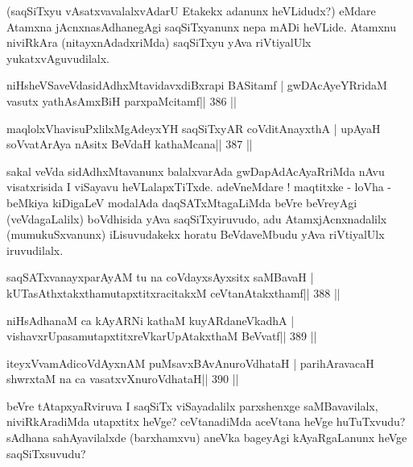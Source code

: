 \begin{artha}
(saqSiTxyu vAsatxvavalalxvAdarU Etakekx adanunx heVLidudx?) eMdare  \mdash  
Atamxna jAcnxnasAdhanegAgi saqSiTxyanunx nepa mADi heVLide. Atamxnu niviRkAra (nitayxnAdadxriMda) saqSiTxyu yAva riVtiyalUlx yukatxvAguvudilalx.
\end{artha}


\begin{shl}
niHsheVSaveVdasidAdhxMtavidavxdiBxrapi BASitamf |
gwDAcAyeYRridaM vasutx yathA\s sAmxBiH parxpaMcitamf\hfill || 386 ||
\end{shl}

\begin{shl}
maqlolxVhavisuPxlilxMgAdeyxYH saqSiTxyAR coVditA\s nayxthA |
upAyaH soV\s vatArAya nAsitx BeVdaH kathaMcana\hfill || 387 ||
\end{shl}

\begin{artha}
sakal veVda sidAdhxMtavanunx balalxvarAda gwDapAdAcAyaRriMda nAvu  visatxrisida I viSayavu heVLalapxTiTxde. adeVneMdare ! maqtitxke -  loVha - beMkiya kiDigaLeV modalAda daqSATxMtagaLiMda beVre beVreyAgi (veVdagaLalilx) boVdhisida yAva saqSiTxyiruvudo, adu AtamxjAcnxnadalilx (mumukuSxvanunx) iLisuvudakekx horatu BeVdaveMbudu yAva riVtiyalUlx iruvudilalx.
\end{artha}

\begin{shl}
saqSATxvanayxparAyAM tu na coVdayxsAyxsitx saMBavaH |
kUTasAthxtakxthamutapxtitxracitakxM ceVtanAtakxthamf\hfill || 388 ||
\end{shl}

\begin{shl}
niHsAdhanaM ca kAyARNi kathaM kuyARdaneVkadhA |
vishavxrUpasamutapxtitxreVkarUpAtakxthaM BeVvatf\hfill || 389 ||
\end{shl}

\begin{shl}
iteyxVvamAdicoVdAyxnAM puMsavxBAvAnuroVdhataH |
parihAravacaH shwrxtaM na ca vasatxvXnuroVdhataH\hfill || 390 ||
\end{shl}

\begin{artha}
beVre tAtapxyaRviruva I saqSiTx viSayadalilx parxshenxge saMBavavilalx, niviRkAradiMda utapxtitx heVge? ceVtanadiMda aceVtana heVge huTuTxvudu? sAdhana sahAyavilalxde (barxhamxvu) aneVka bageyAgi kAyaRgaLanunx heVge saqSiTxsuvudu?
\end{artha}

